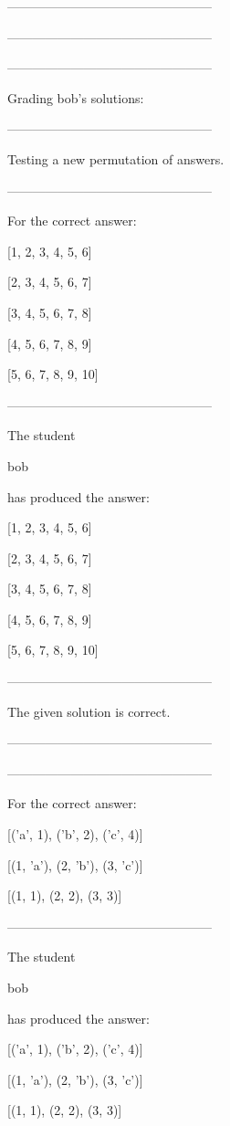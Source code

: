 \documentclass[a4paper,12pt]{article}
\begin{document}
\begin{itemize}
\begin{itemize}
------------------------------------------------

------------------------------------------------

------------------------------------------------

        Grading bob's solutions:

------------------------------------------------

Testing a new permutation of answers.

------------------------------------------------

For the correct answer:

[1, 2, 3, 4, 5, 6]

[2, 3, 4, 5, 6, 7]

[3, 4, 5, 6, 7, 8]

[4, 5, 6, 7, 8, 9]

[5, 6, 7, 8, 9, 10]

------------------------------------------------

The student

        bob

has produced the answer:

[1, 2, 3, 4, 5, 6]

[2, 3, 4, 5, 6, 7]

[3, 4, 5, 6, 7, 8]

[4, 5, 6, 7, 8, 9]

[5, 6, 7, 8, 9, 10]

------------------------------------------------

The given solution is correct.

------------------------------------------------

------------------------------------------------

For the correct answer:

[('a', 1), ('b', 2), ('c', 4)]

[(1, 'a'), (2, 'b'), (3, 'c')]

[(1, 1), (2, 2), (3, 3)]

------------------------------------------------

The student

        bob

has produced the answer:

[('a', 1), ('b', 2), ('c', 4)]

[(1, 'a'), (2, 'b'), (3, 'c')]

[(1, 1), (2, 2), (3, 3)]


\end{itemize}
\end{itemize}
\end{document}
